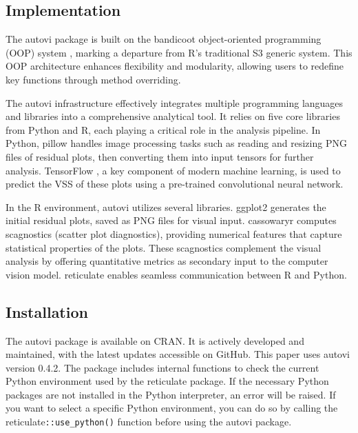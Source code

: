 \documentclass[
doublespace,
  times]{anzsauth}
\begin{document}
\subsection{Implementation}\label{sec-autovi-implementation}

The \textsf{autovi} package is built on the \textsf{bandicoot}
object-oriented programming (OOP) system \citep{bandicoot}, marking a
departure from \textsf{R}'s traditional S3 generic system. This OOP
architecture enhances flexibility and modularity, allowing users to
redefine key functions through method overriding.

The \textsf{autovi} infrastructure effectively integrates multiple
programming languages and libraries into a comprehensive analytical
tool. It relies on five core libraries from \textsf{Python} and
\textsf{R}, each playing a critical role in the analysis pipeline. In
\textsf{Python}, \textsf{pillow} \citep{clark2015pillow} handles image
processing tasks such as reading and resizing PNG files of residual
plots, then converting them into input tensors for further analysis.
\textsf{TensorFlow} \citep{abadi2016tensorflow}, a key component of
modern machine learning, is used to predict the VSS of these plots using
a pre-trained convolutional neural network.

In the \textsf{R} environment, \textsf{autovi} utilizes several
libraries. \textsf{ggplot2} \citep{ggplot2} generates the initial
residual plots, saved as PNG files for visual input. \textsf{cassowaryr}
\citep{mason2022cassowaryr} computes scagnostics (scatter plot
diagnostics), providing numerical features that capture statistical
properties of the plots. These scagnostics complement the visual
analysis by offering quantitative metrics as secondary input to the
computer vision model. \textsf{reticulate} \citep{reticulate} enables
seamless communication between \textsf{R} and \textsf{Python}.

\subsection{Installation}\label{installation}

The \textsf{autovi} package is available on CRAN. It is actively
developed and maintained, with the latest updates accessible on GitHub.
This paper uses \textsf{autovi} version 0.4.2. The package includes
internal functions to check the current \textsf{Python} environment used
by the \textsf{reticulate} package. If the necessary \textsf{Python}
packages are not installed in the \textsf{Python} interpreter, an error
will be raised. If you want to select a specific \textsf{Python}
environment, you can do so by calling the
\textsf{reticulate}\texttt{::use\_python()} function before using the
\textsf{autovi} package.
\end{document}
